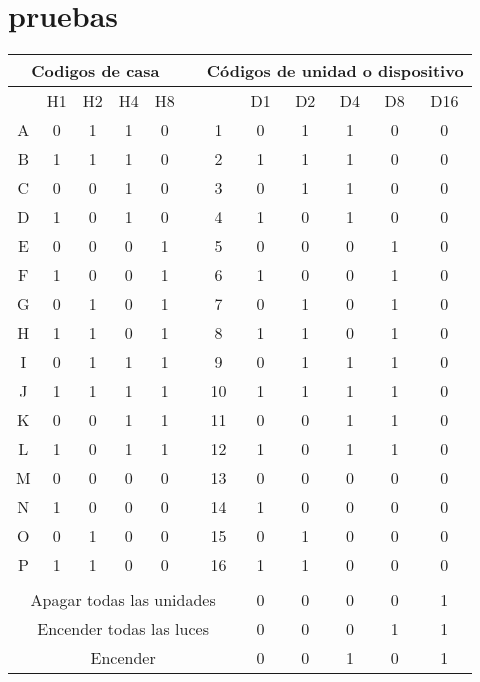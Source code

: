 \chapter{pruebas}

\begin{table}[htbp]
\centering
\begin{tabular}{cccccccccccc}
\toprule
\multicolumn{5}{c}{Codigos de casa} &  &\multicolumn{6}{c}{Códigos de unidad o dispositivo}\\ \toprule
  & H1 & H2 & H4 & H8 &    &    & D1 & D2 & D4 & D8 & D16\\ \midrule
A & 0  & 1  & 1  & 0  &    & 1  & 0  & 1  & 1  & 0  & 0\\
B & 1  & 1  & 1  & 0  &    & 2  & 1  & 1  & 1  & 0  & 0\\
C & 0  & 0  & 1  & 0  &    & 3  & 0  & 1  & 1  & 0  & 0\\
D & 1  & 0  & 1  & 0  &    & 4  & 1  & 0  & 1  & 0  & 0\\
E & 0  & 0  & 0  & 1  &    & 5  & 0  & 0  & 0  & 1  & 0\\
F & 1  & 0  & 0  & 1  &    & 6  & 1  & 0  & 0  & 1  & 0\\
G & 0  & 1  & 0  & 1  &    & 7  & 0  & 1  & 0  & 1  & 0\\
H & 1  & 1  & 0  & 1  &    & 8  & 1  & 1  & 0  & 1  & 0\\
I & 0  & 1  & 1  & 1  &    & 9  & 0  & 1  & 1  & 1  & 0\\
J & 1  & 1  & 1  & 1  &    & 10 & 1  & 1  & 1  & 1  & 0\\
K & 0  & 0  & 1  & 1  &    & 11 & 0  & 0  & 1  & 1  & 0\\
L & 1  & 0  & 1  & 1  &    & 12 & 1  & 0  & 1  & 1  & 0\\
M & 0  & 0  & 0  & 0  &    & 13 & 0  & 0  & 0  & 0  & 0\\
N & 1  & 0  & 0  & 0  &    & 14 & 1  & 0  & 0  & 0  & 0\\
O & 0  & 1  & 0  & 0  &    & 15 & 0  & 1  & 0  & 0  & 0\\
P & 1  & 1  & 0  & 0  &    & 16 & 1  & 1  & 0  & 0  & 0\\ \bottomrule \addlinespace
\multicolumn{12}{c}{Funciones}\\ \midrule
\multicolumn{7}{c}{Apagar todas las unidades} & 0 & 0 & 0 & 0 & 1 \\
\multicolumn{7}{c}{Encender todas las luces}  & 0 & 0 & 0 & 1 & 1 \\
\multicolumn{7}{c}{Encender}                  & 0 & 0 & 1 & 0 & 1 \\

\end{tabular}
\end{table}
